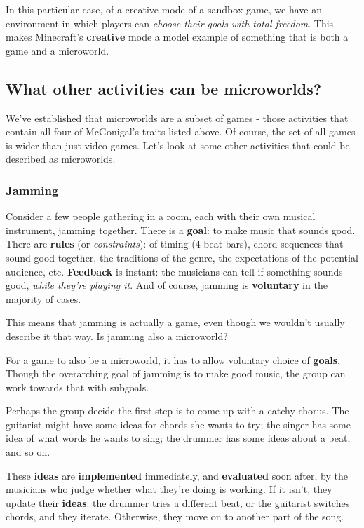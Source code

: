 In this particular case, of a creative mode of a sandbox game, we have
an environment in which players can \emph{choose their goals with total
freedom}. This makes Minecraft's \textbf{creative} mode a model example
of something that is both a game and a microworld.

\subsection{What other activities can be microworlds?}

We've established that microworlds are a subset of games - those
activities that contain all four of McGonigal's traits listed above. Of
course, the set of all games is wider than just video games. Let's look
at some other activities that could be described as microworlds.

\subsubsection{Jamming}

Consider a few people gathering in a room, each with their own musical
instrument, jamming together. There is a \textbf{goal}: to make music
that sounds good. There are \textbf{rules} (or \emph{constraints}): of
timing (4 beat bars), chord sequences that sound good together, the
traditions of the genre, the expectations of the potential audience,
etc. \textbf{Feedback} is instant: the musicians can tell if something
sounds good, \emph{while they're playing it}. And of course, jamming is
\textbf{voluntary} in the majority of cases.

This means that jamming is actually a game, even though we wouldn't
usually describe it that way. Is jamming also a microworld?

For a game to also be a microworld, it has to allow voluntary choice of
\textbf{goals}. Though the overarching goal of jamming is to make good
music, the group can work towards that with subgoals.

Perhaps the group decide the first step is to come up with a catchy
chorus. The guitarist might have some ideas for chords she wants to try;
the singer has some idea of what words he wants to sing; the drummer has
some ideas about a beat, and so on.

These \textbf{ideas} are \textbf{implemented} immediately, and
\textbf{evaluated} soon after, by the musicians who judge whether what
they're doing is working. If it isn't, they update their \textbf{ideas}:
the drummer tries a different beat, or the guitarist switches chords,
and they iterate. Otherwise, they move on to another part of the song.

